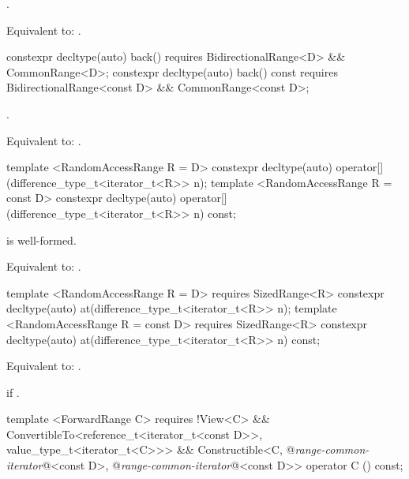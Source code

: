 \begin{itemdescr}
\pnum
\requires {}.

\pnum
\effects Equivalent to: .
\end{itemdescr}

%
\begin{itemdecl}
constexpr decltype(auto) back()
  requires BidirectionalRange<D> && CommonRange<D>;
constexpr decltype(auto) back() const
  requires BidirectionalRange<const D> && CommonRange<const D>;
\end{itemdecl}

\begin{itemdescr}
\pnum
\requires {}.

\pnum
\effects Equivalent to: .
\end{itemdescr}

%
\begin{itemdecl}
template <RandomAccessRange R = D>
constexpr decltype(auto) operator[](difference_type_t<iterator_t<R>> n);
template <RandomAccessRange R = const D>
constexpr decltype(auto) operator[](difference_type_t<iterator_t<R>> n) const;
\end{itemdecl}

\begin{itemdescr}
\pnum
\requires {} is well-formed.

\pnum
\effects Equivalent to: .
\end{itemdescr}

%
\begin{itemdecl}
template <RandomAccessRange R = D>
  requires SizedRange<R>
constexpr decltype(auto) at(difference_type_t<iterator_t<R>> n);
template <RandomAccessRange R = const D>
  requires SizedRange<R>
constexpr decltype(auto) at(difference_type_t<iterator_t<R>> n) const;
\end{itemdecl}

\begin{itemdescr}
\pnum
\effects Equivalent to: .

\pnum
\throws {} if .
\end{itemdescr}

%
\begin{itemdecl}
template <ForwardRange C>
  requires !View<C> &&
    ConvertibleTo<reference_t<iterator_t<const D>>, value_type_t<iterator_t<C>>> &&
    Constructible<C, @\textit{range-common-iterator}@<const D>, @\textit{range-common-iterator}@<const D>>
operator C () const;
\end{itemdecl}

